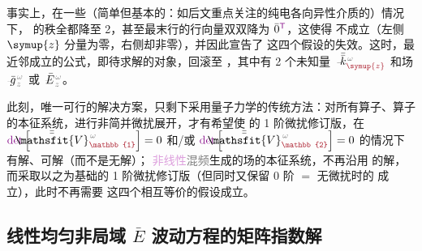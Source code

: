 事实上，在一些（简单但基本的：如后文重点关注的\textcolor{PineGreen}{纯电各向异性}介质的）情况下， 的秩全都降至 2，甚至最末行的行向量双双降为 $\bar{0}^{\mathsf{\textcolor{Plum}{T}}}$，这使得  不成立（左侧 $\symup{z}$ 分量为零，右侧却非零），并因此宣告了  这四个假设的失效。这时，最近邻成立的公式，即待求解的对象，回滚至 ，其中有 2 个未知量 $\xint{\begin{smallmatrix} ~ \\ {}^{}_{\mathcolor{gray}{-}} \\ ~ \end{smallmatrix}}{15}{\bar{\bar{k}}}_{\textcolor{Maroon}{\symup{z}}}^{\;\! \mathcolor{gray}{\omega}}$ 和场 $\xint{{}^{}_{\mathcolor{gray}{-}}}{10}{\bar{g}}^{\;\!\mathcolor{gray}{\omega}}_{\;\! \mathcolor{gray}{z}}$ 或 $\xint{\mathcolor{gray}{-}}{25}{\bar{E}}^{\;\!\mathcolor{gray}{\omega}}_{\;\! \mathcolor{gray}{z}}$。

此刻，唯一可行的解决方案，只剩下采用\textcolor{NavyBlue}{量子力学}的传统方法：对所有算子、算子的\textcolor{PineGreen}{本征系统}，进行\textcolor{NavyBlue}{非简并微扰展开}，才有希望使 {\one}  的 \textcolor{NavyBlue}{1 阶微扰}修订版，在 $\textcolor{Plum}{\det} \left[ \xint{\mathcolor{gray}{-}}{25}{\bar{\bar{\mathsfit{V}}}}^{\;\! \mathcolor{gray}{\omega}}_{\textcolor{Maroon}{\mathbb{1}}} \right] = 0$ 和/或 $\textcolor{Plum}{\det} \left[ \xint{\mathcolor{gray}{-}}{25}{\bar{\bar{\mathsfit{V}}}}^{\;\! \mathcolor{gray}{\omega}}_{\textcolor{Maroon}{\mathbb{2}}} \right] = 0$ 的情况下有解、可解（而不是无解）；{\two} \textcolor{Plum}{非线性}\textcolor{gray}{混频}生成的场的\textcolor{PineGreen}{本征系统}，不再沿用  的解，而采取以之为基础的 \textcolor{NavyBlue}{1 阶微扰}修订版（但同时又保留 \textcolor{NavyBlue}{0 阶} $=$ \textcolor{NavyBlue}{无微扰}时的  成立），此时不再需要  这四个相互等价的假设成立。

\clearpage
\vspace*{-7.5em}


\subsection{线性均匀非局域 $\bar{E}$ 波动方程的矩阵指数解}\label{ssec:Exp-solution-linear}

